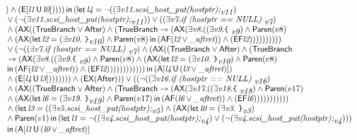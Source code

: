 \documentclass{article}
\newcommand{\U}{\,\mbox{\sf{U}}\,}
\newcommand{\A}{\mbox{\sf{A}}}
\newcommand{\E}{\mbox{\sf{E}}}
\newcommand{\AX}{\mbox{\sf{AX}}}
\newcommand{\EX}{\mbox{\sf{EX}}}
\newcommand{\AF}{\mbox{\sf{AF}}}
\newcommand{\EF}{\mbox{\sf{EF}}}
\newcommand{\mita}[1]{\mbox{\it{{#1}}}}
\newcommand{\msf}[1]{\mbox{\sf{{#1}}}}
\newcommand{\ttlb}{\mbox{\tt \char'173}}
\newcommand{\ttrb}{\mbox{\tt \char'175}}
\begin{document}
\[\begin{array}{l}
) \wedge (\E[\mita{l1} \U \mita{l0}]
)
)
)) \, \mita{\sf{in}} \, (\mita{\sf{let}} \, \mita{l4} = \neg ((\exists \mita{v11} . \mita{scsi\_host\_put(hostptr);}_{\mita{v11}})\\\mbox{} \vee (\neg (\exists \mita{v11} . \mita{scsi\_host\_put(hostptr);}_{\mita{v11}})) \vee ((\exists \mita{v7} . \mita{if (hostptr == NULL) }_{\mita{v7}})\\\mbox{} \wedge (\AX((\msf{TrueBranch} \vee \msf{After}) \wedge (\msf{TrueBranch} \rightarrow (\AX(\exists \mita{v8} . ((\exists \mita{v9} . \mita{{\ttlb}
  }_{\mita{v9}}) \wedge \msf{Paren}(v8)\\\mbox{} \wedge (\AX(\mita{\sf{let}} \, \mita{l2} = (\exists \mita{v10} . \mita{
{\ttrb}}_{\mita{v10}}) \wedge \msf{Paren}(v8) \, \mita{\sf{in}} \, (\AF(\mita{l2} \vee \mita{\_aftret})) \wedge (\EF\mita{l2})
)))))))))\\\mbox{} \vee (\neg ((\exists \mita{v7} . \mita{if (hostptr == NULL) }_{\mita{v7}}) \wedge (\AX((\msf{TrueBranch} \vee \msf{After}) \wedge (\msf{TrueBranch}\\\mbox{} \rightarrow (\AX(\exists \mita{v8} . ((\exists \mita{v9} . \mita{{\ttlb}
  }_{\mita{v9}}) \wedge \msf{Paren}(v8) \wedge (\AX(\mita{\sf{let}} \, \mita{l2} = (\exists \mita{v10} . \mita{
{\ttrb}}_{\mita{v10}}) \wedge \msf{Paren}(v8)\\\mbox{} \, \mita{\sf{in}} \, (\AF(\mita{l2} \vee \mita{\_aftret})) \wedge (\EF\mita{l2})
))))))))))) \, \mita{\sf{in}} \, (\A[\mita{l4} \U (\mita{l3} \vee \mita{\_aftret})]
)\\\mbox{} \wedge (\E[\mita{l4} \U \mita{l3}]
)
)
))))) \wedge (\EX(\msf{After}))) \vee ((\neg ((\exists \mita{v16} . \mita{if (hostptr == NULL) }_{\mita{v16}})\\\mbox{} \wedge (\AX((\msf{TrueBranch} \vee \msf{After}) \wedge (\msf{TrueBranch} \rightarrow (\AX(\exists \mita{v17} . ((\exists \mita{v18} . \mita{{\ttlb}
  }_{\mita{v18}}) \wedge \msf{Paren}(v17)\\\mbox{} \wedge (\AX(\mita{\sf{let}} \, \mita{l6} = (\exists \mita{v19} . \mita{
{\ttrb}}_{\mita{v19}}) \wedge \msf{Paren}(v17) \, \mita{\sf{in}} \, (\AF(\mita{l6} \vee \mita{\_aftret})) \wedge (\EF\mita{l6})
))))))))))\\\mbox{} \wedge (\mita{\sf{let}} \, \mita{l3} = ((\exists \mita{v5} . \mita{scsi\_host\_put(hostptr);}_{\mita{v5}}) \wedge (\AX(\mita{\sf{let}} \, \mita{l0} = (\exists \mita{v3} . \mita{
{\ttrb}}_{\mita{v3}})\\\mbox{} \wedge \msf{Paren}(v1) \, \mita{\sf{in}} \, (\mita{\sf{let}} \, \mita{l1} = \neg ((\exists \mita{v4} . \mita{scsi\_host\_put(hostptr);}_{\mita{v4}}) \vee (\neg (\exists \mita{v4} . \mita{scsi\_host\_put(hostptr);}_{\mita{v4}})))\\\mbox{} \, \mita{\sf{in}} \, (\A[\mita{l1} \U (\mita{l0} \vee \mita{\_aftret})]

\end{array}\]
\end{document}
